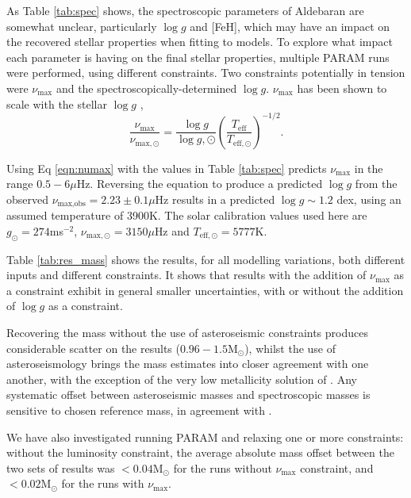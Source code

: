 \documentclass[modern]{aastex61}
\begin{document}
As Table \ref{tab:spec} shows, the spectroscopic parameters of Aldebaran are somewhat unclear, particularly $\log{g}$ and [FeH], which may have an impact on the recovered stellar properties when fitting to models. To explore what impact each parameter is having on the final stellar properties, multiple \textsc{PARAM} runs were performed, using different constraints. Two constraints potentially in tension were $\nu_{\textrm{max}}$ and the spectroscopically-determined $\log{g}$. $\nu_{\textrm{max}}$ has been shown to scale with the stellar $\log{g}$ \citep{Kjeldsen95, 2011A&A...530A.142B},
\begin{equation}
\frac{\nu_{\textrm{max}}}{\nu_{\textrm{max},\odot}}=\frac{\log{g}}{\log{g},\odot}\left(\frac{T_{\textrm{eff}}}{T_{\textrm{eff},\odot}}\right)^{-1/2}.
\label{eqn:numax}
\end{equation}

Using Eq \ref{eqn:numax} with the values in Table \ref{tab:spec} predicts $\nu_{\textrm{max}}$ in the range $0.5-6\mu$Hz. Reversing the equation to produce a predicted $\log{g}$ from the observed $\nu_{\textrm{max,obs}}=2.23\pm0.1\mu$Hz results in a predicted $\log{g}\sim1.2$ dex, using an assumed temperature of 3900K. The solar calibration values used here are $g_{\odot}=274$ms$^{-2}$, $\nu_{\textrm{max},\odot}=3150\mu$Hz and $T_{\textrm{eff},\odot}=5777$K.

Table \ref{tab:res_mass} shows the results, for all modelling variations, both different inputs and different constraints. It shows that results with the addition of $\nu_{\textrm{max}}$ as a constraint exhibit in general smaller uncertainties, with or without the addition of $\log{g}$ as a constraint.

Recovering the mass without the use of asteroseismic constraints produces considerable scatter on the results ($0.96-1.5\textrm{M}_{\odot}$), whilst the use of asteroseismology brings the mass estimates into closer agreement with one another, with the exception of the very low metallicity solution of \cite{2008Massarotti}. Any systematic offset between asteroseismic masses and spectroscopic masses is sensitive to chosen reference mass, in agreement with \cite{2017North}.

We have also investigated running \textsc{PARAM} and relaxing one or more constraints: without the luminosity constraint, the average absolute mass offset between the two sets of results was $<0.04\textrm{M}_{\odot}$ for the runs without $\nu_{\textrm{max}}$ constraint, and $<0.02\textrm{M}_{\odot}$ for the runs with $\nu_{\textrm{max}}$.
\end{document}
